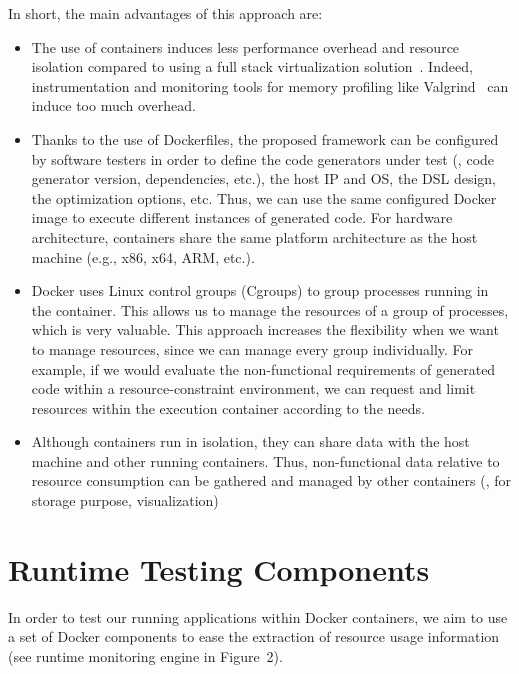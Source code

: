 In short, the main advantages of this approach are:
\begin{itemize}
	\item The use of containers induces less performance overhead and resource isolation compared to using a full stack virtualization solution~\cite{spoiala2016performance}. Indeed, instrumentation and monitoring tools for memory profiling like Valgrind~\cite{nethercote2007valgrind} can induce too much overhead.
	\item Thanks to the use of Dockerfiles, the proposed framework can be  configured by software testers in order to define the code generators under test (\eg, code generator version, dependencies, etc.), the host IP and OS, the DSL design, the optimization options, etc. Thus, we can use the same configured Docker image to execute different instances of generated code. For hardware architecture, containers share the same platform architecture as the host machine (e.g., x86, x64, ARM, etc.). 
	\item Docker uses Linux control groups (Cgroups) to group processes running in the container. This allows us to manage the resources of a group of processes, which is very valuable. 
	This approach increases the flexibility when we want to manage resources, since we can manage every group individually. For example, if we would evaluate the non-functional requirements of generated code within a resource-constraint environment, we can  request and limit resources within the execution container according to the needs.
	\item Although containers run in isolation, they can share data with the host machine and other running containers. Thus, non-functional data relative to resource consumption can be gathered and managed by other containers (\ie, for storage purpose, visualization)
\end{itemize}




\section{Runtime Testing Components}
In order to test our running applications within Docker containers, we aim to use a set of Docker components to ease the extraction of resource usage information (see runtime monitoring engine in Figure~2).
